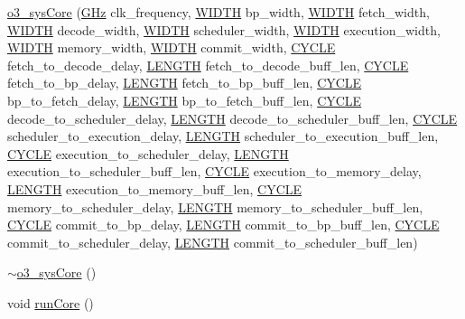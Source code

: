 \begin{DoxyCompactItemize}
\hyperlink{classo3__sysCore_aa2fc24a24dd599ff3393c62910cbcb06}{o3\_\-sysCore} (\hyperlink{global_2global_8h_a32516e1b668a88eb546e9b6ee2e3345d}{GHz} clk\_\-frequency, \hyperlink{global_2global_8h_a6fa2e24b8a418fa215e183264cbea3aa}{WIDTH} bp\_\-width, \hyperlink{global_2global_8h_a6fa2e24b8a418fa215e183264cbea3aa}{WIDTH} fetch\_\-width, \hyperlink{global_2global_8h_a6fa2e24b8a418fa215e183264cbea3aa}{WIDTH} decode\_\-width, \hyperlink{global_2global_8h_a6fa2e24b8a418fa215e183264cbea3aa}{WIDTH} scheduler\_\-width, \hyperlink{global_2global_8h_a6fa2e24b8a418fa215e183264cbea3aa}{WIDTH} execution\_\-width, \hyperlink{global_2global_8h_a6fa2e24b8a418fa215e183264cbea3aa}{WIDTH} memory\_\-width, \hyperlink{global_2global_8h_a6fa2e24b8a418fa215e183264cbea3aa}{WIDTH} commit\_\-width, \hyperlink{global_2global_8h_a7e19a550ec11d1ed921deb20c22efb5b}{CYCLE} fetch\_\-to\_\-decode\_\-delay, \hyperlink{global_2global_8h_ad7ec63c69447a2b630929c8e0197860d}{LENGTH} fetch\_\-to\_\-decode\_\-buff\_\-len, \hyperlink{global_2global_8h_a7e19a550ec11d1ed921deb20c22efb5b}{CYCLE} fetch\_\-to\_\-bp\_\-delay, \hyperlink{global_2global_8h_ad7ec63c69447a2b630929c8e0197860d}{LENGTH} fetch\_\-to\_\-bp\_\-buff\_\-len, \hyperlink{global_2global_8h_a7e19a550ec11d1ed921deb20c22efb5b}{CYCLE} bp\_\-to\_\-fetch\_\-delay, \hyperlink{global_2global_8h_ad7ec63c69447a2b630929c8e0197860d}{LENGTH} bp\_\-to\_\-fetch\_\-buff\_\-len, \hyperlink{global_2global_8h_a7e19a550ec11d1ed921deb20c22efb5b}{CYCLE} decode\_\-to\_\-scheduler\_\-delay, \hyperlink{global_2global_8h_ad7ec63c69447a2b630929c8e0197860d}{LENGTH} decode\_\-to\_\-scheduler\_\-buff\_\-len, \hyperlink{global_2global_8h_a7e19a550ec11d1ed921deb20c22efb5b}{CYCLE} scheduler\_\-to\_\-execution\_\-delay, \hyperlink{global_2global_8h_ad7ec63c69447a2b630929c8e0197860d}{LENGTH} scheduler\_\-to\_\-execution\_\-buff\_\-len, \hyperlink{global_2global_8h_a7e19a550ec11d1ed921deb20c22efb5b}{CYCLE} execution\_\-to\_\-scheduler\_\-delay, \hyperlink{global_2global_8h_ad7ec63c69447a2b630929c8e0197860d}{LENGTH} execution\_\-to\_\-scheduler\_\-buff\_\-len, \hyperlink{global_2global_8h_a7e19a550ec11d1ed921deb20c22efb5b}{CYCLE} execution\_\-to\_\-memory\_\-delay, \hyperlink{global_2global_8h_ad7ec63c69447a2b630929c8e0197860d}{LENGTH} execution\_\-to\_\-memory\_\-buff\_\-len, \hyperlink{global_2global_8h_a7e19a550ec11d1ed921deb20c22efb5b}{CYCLE} memory\_\-to\_\-scheduler\_\-delay, \hyperlink{global_2global_8h_ad7ec63c69447a2b630929c8e0197860d}{LENGTH} memory\_\-to\_\-scheduler\_\-buff\_\-len, \hyperlink{global_2global_8h_a7e19a550ec11d1ed921deb20c22efb5b}{CYCLE} commit\_\-to\_\-bp\_\-delay, \hyperlink{global_2global_8h_ad7ec63c69447a2b630929c8e0197860d}{LENGTH} commit\_\-to\_\-bp\_\-buff\_\-len, \hyperlink{global_2global_8h_a7e19a550ec11d1ed921deb20c22efb5b}{CYCLE} commit\_\-to\_\-scheduler\_\-delay, \hyperlink{global_2global_8h_ad7ec63c69447a2b630929c8e0197860d}{LENGTH} commit\_\-to\_\-scheduler\_\-buff\_\-len)
\item 
\hyperlink{classo3__sysCore_af4d8e609d9501b5511b70fbdfa218772}{$\sim$o3\_\-sysCore} ()
\item 
void \hyperlink{classo3__sysCore_ab97edaa7f8ea74d7315b71d7d03a736c}{runCore} ()
\end{DoxyCompactItemize}


